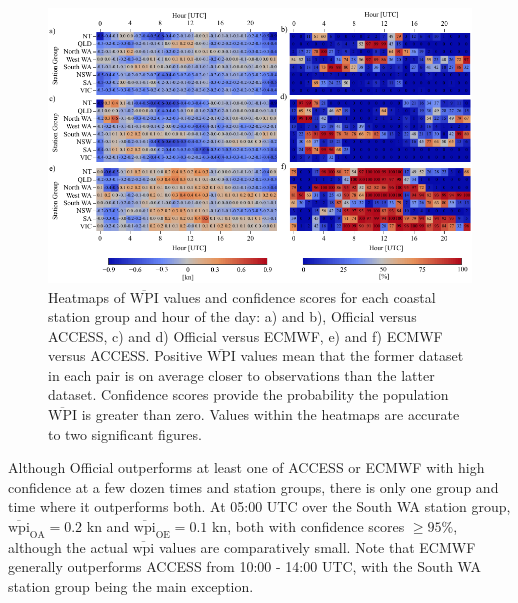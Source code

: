 \documentclass[alpha-refs]{wiley-article}
\begin{document}
\begin{figure}
\centering
\includegraphics{wpi_coastal.pdf}
\caption{Heatmaps of $\overline{\text{WPI}}$ values and confidence scores for each coastal station group and hour of the day: a) and b), Official versus ACCESS, c) and d) Official versus ECMWF, e) and f) ECMWF versus ACCESS. Positive $\overline{\text{WPI}}$ values mean that the former dataset in each pair is on average closer to observations than the latter dataset. Confidence scores provide the probability the population $\overline{\text{WPI}}$ is greater than zero. Values within the heatmaps are accurate to two significant figures.}
\label{Fig:wpi_coastal}
\end{figure}

Although Official outperforms at least one of ACCESS or ECMWF with high confidence at a few dozen times and station groups, there is only one group and time where it outperforms both. At 05:00 UTC over the South WA station group, $\overline{\text{wpi}}_\text{OA} = 0.2$ kn and $\overline{\text{wpi}}_\text{OE} = 0.1$ kn, both with confidence scores $\geq 95\%$, although the actual $\overline{\text{wpi}}$ values are comparatively small. Note that ECMWF generally outperforms ACCESS from 10:00 - 14:00 UTC, with the South WA station group being the main exception.    
\end{document}
